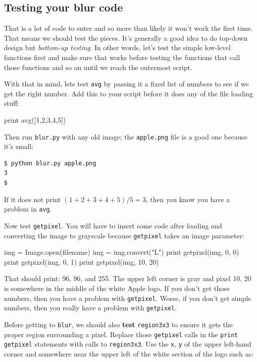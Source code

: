 \subsection{Testing your blur code}

That is a lot of code to enter and so more than likely it won't work the first time. That means we should test the pieces. It's generally a good idea to do top-down design but {\em bottom-up testing}. In other words, let's test the simple low-level functions first and make sure that works before testing the functions that call those functions and so on until we reach the outermost script. 

With that in mind, lets test {\tt avg} by passing it a fixed list of numbers to see if we get the right number. Add this to your script before it does any of the file loading stuff:

\begin{pyverbatim}
print avg([1,2,3,4,5])
\end{pyverbatim}

\noindent Then run {\tt blur.py} with any old image; the {\tt apple.png} file is a good one because it's small:

\begin{lstlisting}[style=BashInputStyle]
$ python blur.py apple.png
3
$ 
\end{lstlisting}

\noindent If it does not print $(1+2+3+4+5)/5 = 3$, then you know you have a problem in {\tt avg}.

Now test {\tt getpixel}. You will have to insert some code after loading and converting the image to grayscale because {\tt getpixel} takes an image parameter:

\begin{pyverbatim}
img = Image.open(filename)
img = img.convert("L")
print getpixel(img, 0, 0)
print getpixel(img, 0, 1)
print getpixel(img, 10, 20)
\end{pyverbatim}

\noindent  That should print: 96, 96, and 255. The upper left corner is gray and pixel 10, 20 is somewhere in the middle of the white Apple logo. If you don't get those numbers, then you have a problem with {\tt getpixel}. Worse, if you don't get simple numbers, then you really have a problem with {\tt getpixel}.

Before getting to {\tt blur}, we should also {\bf test} {\tt region3x3} to ensure it gets the proper region surrounding a pixel. Replace those {\tt getpixel} calls in the {\tt print} {\tt getpixel} statements with calls to {\tt region3x3}. Use the {\tt x}, {\tt y} of the upper left-hand corner and somewhere near the upper left of the white section of the logo such as:

